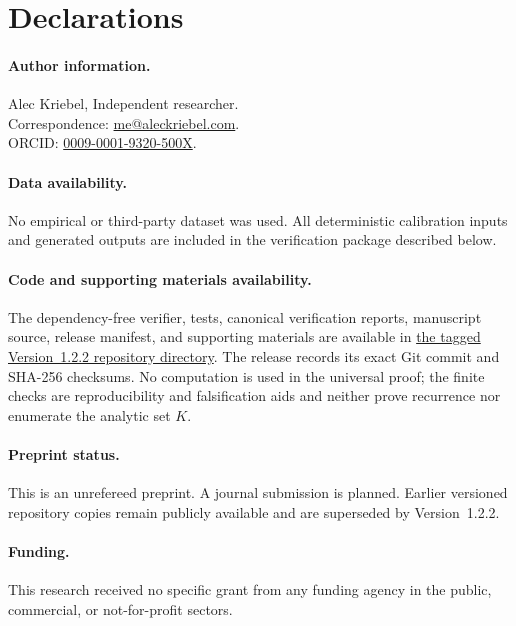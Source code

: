 \section*{Declarations}

\paragraph{Author information.}
Alec Kriebel, Independent researcher.\\
Correspondence: \mbox{\href{mailto:me@aleckriebel.com}{me@aleckriebel.com}}.\\
ORCID: \href{https://orcid.org/0009-0001-9320-500X}{0009-0001-9320-500X}.

\paragraph{Data availability.}
No empirical or third-party dataset was used.  All deterministic calibration
inputs and generated outputs are included in the verification package
described below.

\paragraph{Code and supporting materials availability.}
The dependency-free verifier, tests, canonical verification reports,
manuscript source, release manifest, and supporting materials are available in
\href{https://github.com/AlecKriebel/Math/tree/bimolecular-positive-recurrence-v1.2.2/bimolecular_positive_recurrence_submission_v1_2_2}{the tagged Version~1.2.2 repository directory}.
The release records its exact Git commit and SHA-256 checksums.  No computation
is used in the universal proof; the finite checks are reproducibility and
falsification aids and neither prove recurrence nor enumerate the analytic set
\(K\).

\paragraph{Preprint status.}
This is an unrefereed preprint.  A journal submission is planned.  Earlier
versioned repository copies remain publicly available and are superseded by
Version~1.2.2.

\paragraph{Funding.}
This research received no specific grant from any funding agency in the public,
commercial, or not-for-profit sectors.

